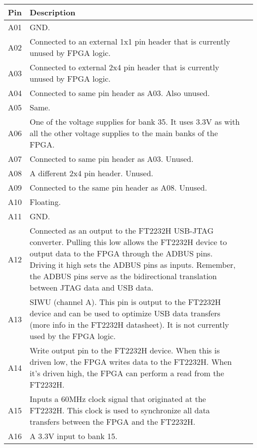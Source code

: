 \label{tab:fpga-pins}
\begin{tabularx}{\textwidth}{c X>{\raggedright\arraybackslash}X}
        \caption{FPGA pinout. Displayed in alphanumeric order.} \\
        \toprule
        Pin & Description \\
        \midrule

        A01 & GND\@. \\
        A02 & Connected to an external 1x1 pin header that is currently unused by FPGA logic. \\
        A03 & Connected to external 2x4 pin header that is currently unused by FPGA logic. \\
        A04 & Connected to same pin header as A03. Also unused. \\
        A05 & Same. \\
        A06 & One of the voltage supplies for bank 35. It uses 3.3V as with all the other voltage supplies
        to the main banks of the FPGA. \\
        A07 & Connected to same pin header as A03. Unused. \\
        A08 & A different 2x4 pin header. Unused. \\
        A09 & Connected to the same pin header as A08. Unused. \\
        A10 & Floating. \\
        A11 & GND\@. \\
        A12 & Connected as an output to the FT2232H USB-JTAG converter. Pulling this low allows the
        FT2232H device to output data to the FPGA through the ADBUS pins. Driving it high sets the ADBUS
        pins as inputs. Remember, the ADBUS pins serve as the bidirectional translation between JTAG data
        and USB data. \\
        A13 & SIWU (channel A). This pin is output to the FT2232H device and can be used to optimize USB
        data transfers (more info in the FT2232H datasheet). It is not currently used by the FPGA
        logic. \\
        A14 & Write output pin to the FT2232H device. When this is driven low, the FPGA writes data to the
        FT2232H. When it's driven high, the FPGA can perform a read from the FT2232H. \\
        A15 & Inputs a 60MHz clock signal that originated at the FT2232H. This clock is used to
        synchronize all data transfers between the FPGA and the FT2232H. \\
        A16 & A 3.3V input to bank 15. \\


\end{tabularx}
